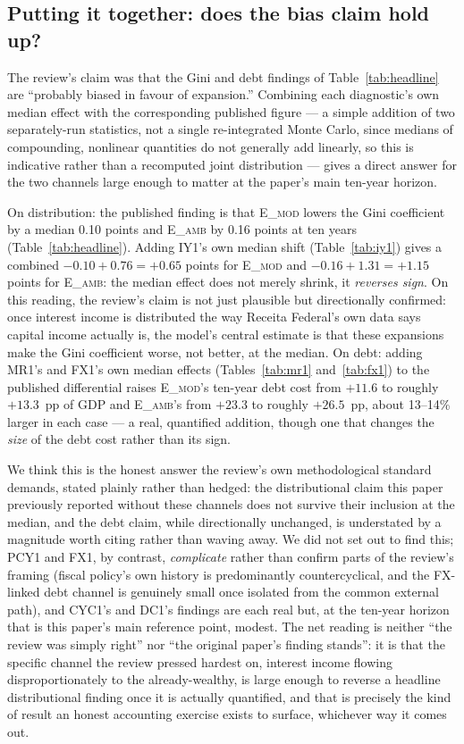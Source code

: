\documentclass[11pt,a4paper]{article}
\begin{document}
\subsection{Putting it together: does the bias claim hold up?}
\label{sec:discussion-reviewer-synthesis}

The review's claim was that the Gini and debt findings of Table~\ref{tab:headline} are ``probably biased in favour of expansion.'' Combining each diagnostic's own median effect with the corresponding published figure --- a simple addition of two separately-run statistics, not a single re-integrated Monte Carlo, since medians of compounding, nonlinear quantities do not generally add linearly, so this is indicative rather than a recomputed joint distribution --- gives a direct answer for the two channels large enough to matter at the paper's main ten-year horizon.

On distribution: the published finding is that \textsc{E\_mod} lowers the Gini coefficient by a median 0.10 points and \textsc{E\_amb} by 0.16 points at ten years (Table~\ref{tab:headline}). Adding IY1's own median shift (Table~\ref{tab:iy1}) gives a combined $-0.10+0.76=+0.65$ points for \textsc{E\_mod} and $-0.16+1.31=+1.15$ points for \textsc{E\_amb}: the median effect does not merely shrink, it \emph{reverses sign}. On this reading, the review's claim is not just plausible but directionally confirmed: once interest income is distributed the way Receita Federal's own data says capital income actually is, the model's central estimate is that these expansions make the Gini coefficient worse, not better, at the median. On debt: adding MR1's and FX1's own median effects (Tables~\ref{tab:mr1} and~\ref{tab:fx1}) to the published differential raises \textsc{E\_mod}'s ten-year debt cost from $+11.6$ to roughly $+13.3$~pp of GDP and \textsc{E\_amb}'s from $+23.3$ to roughly $+26.5$~pp, about 13--14\% larger in each case --- a real, quantified addition, though one that changes the \emph{size} of the debt cost rather than its sign.

We think this is the honest answer the review's own methodological standard demands, stated plainly rather than hedged: the distributional claim this paper previously reported without these channels does not survive their inclusion at the median, and the debt claim, while directionally unchanged, is understated by a magnitude worth citing rather than waving away. We did not set out to find this; PCY1 and FX1, by contrast, \emph{complicate} rather than confirm parts of the review's framing (fiscal policy's own history is predominantly countercyclical, and the FX-linked debt channel is genuinely small once isolated from the common external path), and CYC1's and DC1's findings are each real but, at the ten-year horizon that is this paper's main reference point, modest. The net reading is neither ``the review was simply right'' nor ``the original paper's finding stands'': it is that the specific channel the review pressed hardest on, interest income flowing disproportionately to the already-wealthy, is large enough to reverse a headline distributional finding once it is actually quantified, and that is precisely the kind of result an honest accounting exercise exists to surface, whichever way it comes out.
\end{document}

